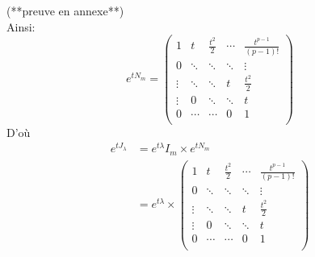 \documentclass[a4paper]{article}
\theoremstyle{plain}
\theoremstyle{definition}
\theoremstyle{remark}
\begin{document}
(**preuve en annexe**)\\
Ainsi:
$$
    e^{tN_m}=\begin{pmatrix}
1 & t& \frac{t^2}{2} & \cdots & \frac{t^{p-1}}{(p-1)!} \\
0 & \ddots&\ddots & \ddots & \vdots \\
\vdots & \ddots & \ddots &t& \frac{t^2}{2} \\
\vdots & 0&\ddots & \ddots & t \\
0 & \cdots&\cdots & 0 & 1 \\ \end{pmatrix}$$
D'où 
\begin{align*}
    e^{tJ_\lambda}&=e^{t\lambda}I_m\times e^{tN_m}\\
    &=e^{t\lambda}\times \begin{pmatrix}
1 & t& \frac{t^2}{2} & \cdots & \frac{t^{p-1}}{(p-1)!} \\
0 & \ddots&\ddots & \ddots & \vdots \\
\vdots & \ddots & \ddots &t& \frac{t^2}{2} \\
\vdots & 0&\ddots & \ddots & t \\
0 & \cdots&\cdots & 0 & 1 \\ \end{pmatrix}
\end{align*}
\end{document}
